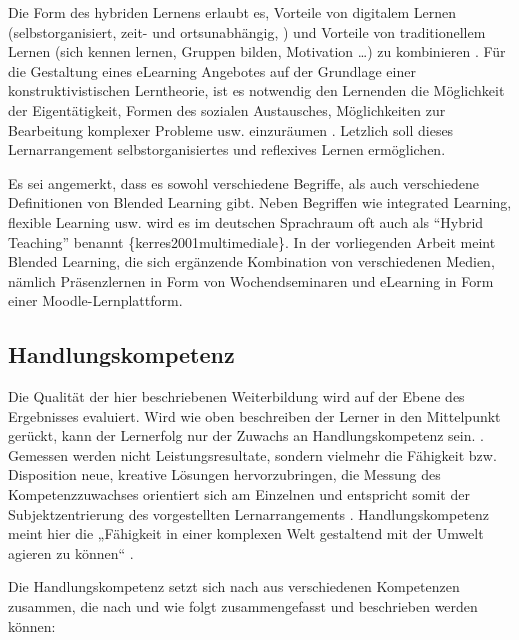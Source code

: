\documentclass[12pt, bibliography=totoc]{scrartcl}
\begin{document}
Die Form des hybriden Lernens erlaubt es, Vorteile von digitalem Lernen
(selbstorganisiert, zeit- und ortsunabhängig, ) und Vorteile von
traditionellem Lernen (sich kennen lernen, Gruppen bilden, Motivation
\ldots) zu kombinieren \parencite{Zumbach2010}. Für die Gestaltung eines
eLearning Angebotes auf der Grundlage einer konstruktivistischen
Lerntheorie, ist es notwendig den Lernenden die Möglichkeit der
Eigentätigkeit, Formen des sozialen Austausches, Möglichkeiten zur
Bearbeitung komplexer Probleme usw. einzuräumen
. Letzlich soll dieses Lernarrangement
selbstorganisiertes und reflexives Lernen ermöglichen.

Es sei angemerkt, dass es sowohl verschiedene Begriffe, als auch
verschiedene Definitionen von Blended Learning gibt. Neben Begriffen wie
integrated Learning, flexible Learning usw. wird es im deutschen
Sprachraum oft auch als \enquote{Hybrid Teaching} benannt
\parencite{Oliver2005}\{kerres2001multimediale\}. In der vorliegenden
Arbeit meint Blended Learning, die sich ergänzende Kombination von
verschiedenen Medien, nämlich Präsenzlernen in Form von Wochendseminaren
und eLearning in Form einer Moodle-Lernplattform.

\subsection{Handlungskompetenz}\label{handlungskompetenz}

Die Qualität der hier beschriebenen Weiterbildung wird auf der Ebene des
Ergebnisses evaluiert. Wird wie oben beschreiben der Lerner in den
Mittelpunkt gerückt, kann der Lernerfolg nur der Zuwachs an
Handlungskompetenz sein. \parencite[4]{Ehlers2002}. Gemessen werden
nicht Leistungsresultate, sondern vielmehr die Fähigkeit bzw.
Disposition neue, kreative Lösungen hervorzubringen, die Messung des
Kompetenzzuwachses orientiert sich am Einzelnen und entspricht somit der
Subjektzentrierung des vorgestellten Lernarrangements
\parencite{ErpenbeckRosenstiel200305}. Handlungskompetenz meint hier die
„Fähigkeit in einer komplexen Welt gestaltend mit der Umwelt agieren zu
können`` \parencite[4]{Ehlers2002}.

Die Handlungskompetenz setzt sich nach
\textcite{ErpenbeckRosenstiel200305} aus verschiedenen Kompetenzen
zusammen, die nach \textcite{ErpenbeckRosenstiel200305} und
\autocite{Braun2008} wie folgt zusammengefasst und beschrieben werden
können:
\end{document}
